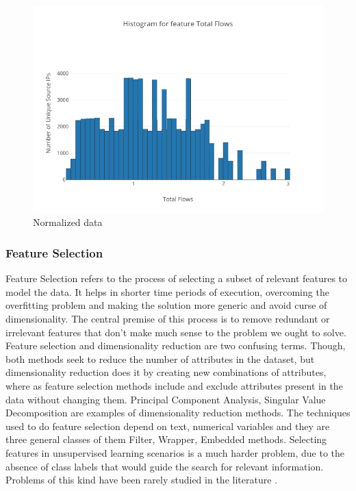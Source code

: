 \begin{figure}[t]
	\centerline{\includegraphics[scale = 0.9]{transformed.png}}
	\caption{Normalized data}%
\end{figure}



\subsubsection{Feature Selection}		
	
	Feature Selection refers to the process of selecting a subset of relevant features to model the data. It helps in shorter time periods of execution, overcoming the overfitting problem and making the solution more generic and avoid curse of dimensionality. The central premise of this process is to remove redundant or irrelevant features that don't make much sense to the problem we ought to solve. Feature selection and dimensionality reduction are two confusing terms. Though, both methods seek to reduce the number of attributes in the dataset, but dimensionality reduction does it by creating new combinations of attributes, where as feature selection methods include and exclude attributes present in the data without changing them. Principal Component Analysis, Singular Value Decomposition are examples of dimensionality reduction methods. The techniques used to do feature selection depend on text, numerical variables and they are three general classes of them Filter, Wrapper, Embedded methods.	
	Selecting features in unsupervised learning scenarios is a much harder problem, due to the	absence of class labels that would guide the search for relevant information. Problems of
	this kind have been rarely studied in the literature \cite{boutsidis2009unsupervised} \cite{dash2002feature}. 
	
